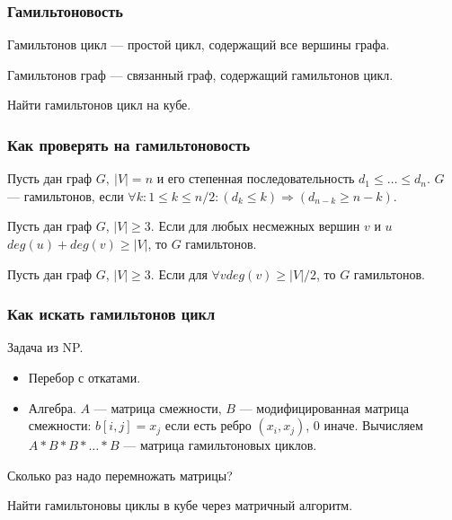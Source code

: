 \documentclass[xcolor=table]{beamer}
\begin{document}
\begin{frame} \frametitle{Гамильтоновость}
  
\begin{definition}
Гамильтонов цикл --- простой цикл, содержащий все вершины графа.
\end{definition}


\begin{definition}
Гамильтонов граф --- связанный граф, содержащий гамильтонов цикл.
\end{definition}

Найти гамильтонов цикл на кубе.

\end{frame}


\begin{frame} \frametitle{Как проверять на гамильтоновость}
  
\begin{theorem}[Хватала]
Пусть дан граф $G, \ |V| = n$ и его степенная последовательность $d_1 \leq \ldots \leq d_n$. $G$ --- гамильтонов, если $\forall k: 1 \leq k \leq n/2 : (d_k \leq k) \Rightarrow (d_{n-k} \geq n-k)$.
\end{theorem}
\pause

\begin{theorem}[Оре]
Пусть дан граф $G$, $|V|\geq 3$. Если для любых несмежных вершин $v$ и $u$ $deg(u) + deg(v) \geq |V|$, то $G$ гамильтонов.
\end{theorem}
\pause

\begin{theorem}[Дирака]
Пусть дан граф $G$, $|V|\geq 3$. Если для $\forall v deg(v) \geq |V|/2$, то $G$ гамильтонов.
\end{theorem}


\end{frame}


\begin{frame} \frametitle{Как искать гамильтонов цикл}

Задача из NP.
  
\begin{itemize}
\item Перебор с откатами.
\pause
\item Алгебра. $A$ --- матрица смежности, $B$ --- модифицированная матрица смежности: $b[i,j] = x_j$ если есть ребро $(x_i,x_j)$, 0 иначе.
Вычисляем $A*B*B*\ldots *B$ --- матрица гамильтоновых циклов.
\end{itemize}

Сколько раз надо перемножать матрицы?

Найти гамильтоновы циклы в кубе через матричный алгоритм.



\end{frame}
\end{document}
